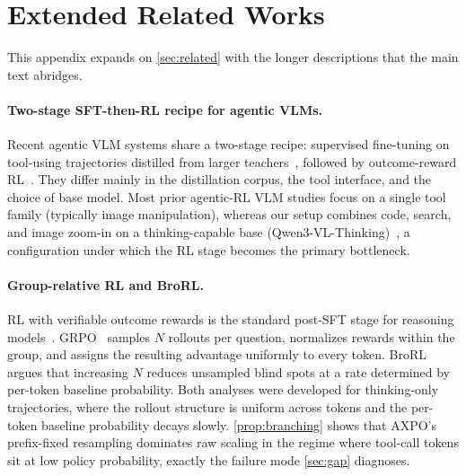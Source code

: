 \section{Extended Related Works}
\label{app:related-works}

This appendix expands on \autoref{sec:related} with the longer descriptions that the main text abridges.

\paragraph{Two-stage SFT-then-RL recipe for agentic VLMs.}
Recent agentic VLM systems share a two-stage recipe: supervised fine-tuning on tool-using trajectories distilled from larger teachers~\citep{FireAct, AgentDistill}, followed by outcome-reward RL~\citep{pyvision-rl, deepeyesv2, deepeyes}. They differ mainly in the distillation corpus, the tool interface, and the choice of base model. Most prior agentic-RL VLM studies focus on a single tool family (typically image manipulation), whereas our setup combines code, search, and image zoom-in on a thinking-capable base (Qwen3-VL-Thinking)~\citep{Qwen3VL}, a configuration under which the RL stage becomes the primary bottleneck.

\paragraph{Group-relative RL and BroRL.}
RL with verifiable outcome rewards is the standard post-SFT stage for reasoning models~\citep{r1, o1}. GRPO~\citep{GRPO, DAPO, prorl} samples $N$ rollouts per question, normalizes rewards within the group, and assigns the resulting advantage uniformly to every token. BroRL~\citep{brorl} argues that increasing $N$ reduces unsampled blind spots at a rate determined by per-token baseline probability. Both analyses were developed for thinking-only trajectories, where the rollout structure is uniform across tokens and the per-token baseline probability decays slowly. \autoref{prop:branching} shows that AXPO's prefix-fixed resampling dominates raw scaling in the regime where tool-call tokens sit at low policy probability, exactly the failure mode \autoref{sec:gap} diagnoses.

